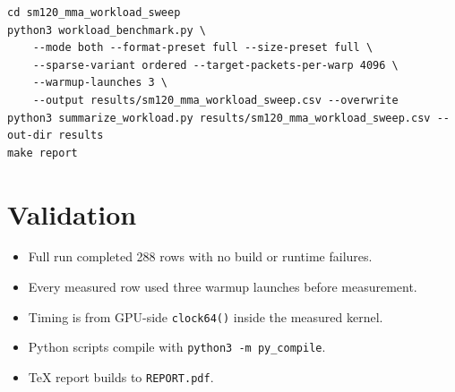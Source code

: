 \documentclass[10pt]{article}
\begin{document}
\begin{verbatim}
cd sm120_mma_workload_sweep
python3 workload_benchmark.py \
    --mode both --format-preset full --size-preset full \
    --sparse-variant ordered --target-packets-per-warp 4096 \
    --warmup-launches 3 \
    --output results/sm120_mma_workload_sweep.csv --overwrite
python3 summarize_workload.py results/sm120_mma_workload_sweep.csv --out-dir results
make report
\end{verbatim}

\section{Validation}

\begin{itemize}
\item Full run completed 288 rows with no build or runtime failures.
\item Every measured row used three warmup launches before measurement.
\item Timing is from GPU-side \texttt{clock64()} inside the measured kernel.
\item Python scripts compile with \texttt{python3 -m py\_compile}.
\item TeX report builds to \texttt{REPORT.pdf}.
\end{itemize}
\end{document}
